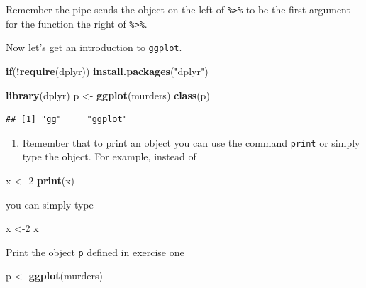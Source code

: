 \documentclass[
]{article}
\newenvironment{Shaded}{\begin{snugshade}}{\end{snugshade}}
\newcommand{\ControlFlowTok}[1]{\textcolor[rgb]{0.13,0.29,0.53}{\textbf{#1}}}
\newcommand{\DecValTok}[1]{\textcolor[rgb]{0.00,0.00,0.81}{#1}}
\newcommand{\KeywordTok}[1]{\textcolor[rgb]{0.13,0.29,0.53}{\textbf{#1}}}
\newcommand{\NormalTok}[1]{#1}
\newcommand{\OperatorTok}[1]{\textcolor[rgb]{0.81,0.36,0.00}{\textbf{#1}}}
\newcommand{\StringTok}[1]{\textcolor[rgb]{0.31,0.60,0.02}{#1}}
\providecommand{\tightlist}{%
  \setlength{\itemsep}{0pt}\setlength{\parskip}{0pt}}
\begin{document}
Remember the pipe sends the object on the left of
\texttt{\%\textgreater{}\%} to be the first argument for the function
the right of \texttt{\%\textgreater{}\%}.

Now let's get an introduction to \texttt{ggplot}.

\begin{Shaded}
\begin{Highlighting}[]
\ControlFlowTok{if}\NormalTok{(}\OperatorTok{!}\KeywordTok{require}\NormalTok{(dplyr)) }\KeywordTok{install.packages}\NormalTok{(}\StringTok{"dplyr"}\NormalTok{)}

\KeywordTok{library}\NormalTok{(dplyr)}
\NormalTok{p <-}\StringTok{ }\KeywordTok{ggplot}\NormalTok{(murders)}
\KeywordTok{class}\NormalTok{(p)}
\end{Highlighting}
\end{Shaded}

\begin{verbatim}
## [1] "gg"     "ggplot"
\end{verbatim}

\begin{enumerate}
\def\labelenumi{\arabic{enumi}.}
\setcounter{enumi}{1}
\tightlist
\item
  Remember that to print an object you can use the command
  \texttt{print} or simply type the object. For example, instead of
\end{enumerate}

\begin{Shaded}
\begin{Highlighting}[]
\NormalTok{x <-}\StringTok{ }\DecValTok{2}
\KeywordTok{print}\NormalTok{(x)}
\end{Highlighting}
\end{Shaded}

you can simply type

\begin{Shaded}
\begin{Highlighting}[]
\NormalTok{x <-}\DecValTok{2}
\NormalTok{x}
\end{Highlighting}
\end{Shaded}

Print the object \texttt{p} defined in exercise one

\begin{Shaded}
\begin{Highlighting}[]
\NormalTok{p <-}\StringTok{ }\KeywordTok{ggplot}\NormalTok{(murders)}
\end{Highlighting}
\end{Shaded}
\end{document}
